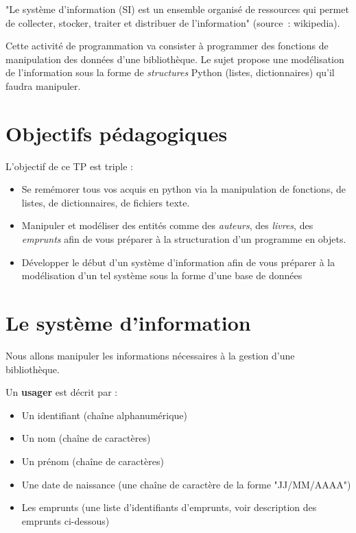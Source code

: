 \documentclass[10pt,a4paper]{sujets-exercices}
\begin{document}

"Le système d'information (SI) est un ensemble organisé de ressources qui permet de collecter, stocker, traiter et distribuer de l'information" (source~: wikipedia).

Cette activité de programmation va consister à programmer des fonctions de manipulation des données d'une bibliothèque. Le sujet propose une modélisation de l'information sous la forme de \emph{structures} Python (listes, dictionnaires) qu'il faudra manipuler.

\section{Objectifs pédagogiques}

L'objectif de ce TP est triple :

\begin{itemize}
\item Se remémorer tous vos acquis en python via la manipulation de fonctions, de listes, de dictionnaires, de fichiers texte.
\item Manipuler et modéliser des entités comme des \emph{auteurs}, des \emph{livres}, des \emph{emprunts} afin de vous préparer à la structuration d'un programme en objets.
\item Développer le début d'un système d'information afin de vous préparer à la modélisation d'un tel système sous la forme d'une base de données
\end{itemize}

\section{Le système d'information}

Nous allons manipuler les informations nécessaires à la gestion d'une bibliothèque.

Un \textbf{usager} est décrit par : 

\begin{itemize}
\item Un identifiant (chaîne alphanumérique)
\item Un nom (chaîne de caractères)
\item Un prénom (chaîne de caractères)
\item Une date de naissance (une chaîne de caractère de la forme "JJ/MM/AAAA")
\item Les emprunts (une liste d'identifiants d'emprunts, voir description des emprunts ci-dessous)
\end{itemize}
\end{document}
